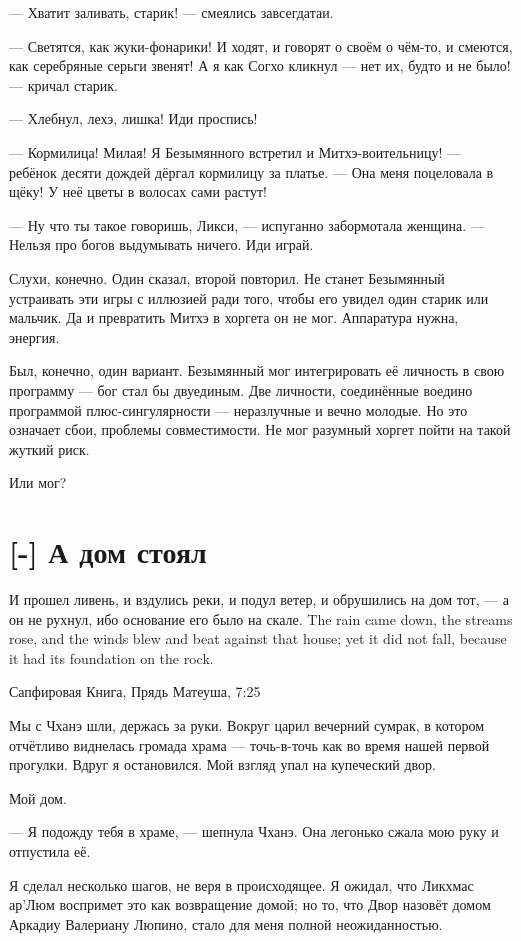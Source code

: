 --- Хватит заливать, старик! --- смеялись завсегдатаи.

--- Светятся, как жуки-фонарики!
И ходят, и говорят о своём о чём-то, и смеются, как серебряные серьги звенят!
А я как Согхо кликнул --- нет их, будто и не было! --- кричал старик.

--- Хлебнул, лехэ, лишка!
Иди проспись!

--- Кормилица!
Милая!
Я Безымянного встретил и Митхэ-воительницу! --- ребёнок десяти дождей дёргал кормилицу за платье.
--- Она меня поцеловала в щёку!
У неё цветы в волосах сами растут!

--- Ну что ты такое говоришь, Ликси, --- испуганно забормотала женщина.
--- Нельзя про богов выдумывать ничего.
Иди играй.

Слухи, конечно.
Один сказал, второй повторил.
Не станет Безымянный устраивать эти игры с иллюзией ради того, чтобы его увидел один старик или мальчик.
Да и превратить Митхэ в хоргета он не мог.
Аппаратура нужна, энергия.

Был, конечно, один вариант.
Безымянный мог интегрировать её личность в свою программу --- бог стал бы двуединым.
Две личности, соединённые воедино программой плюс-сингулярности --- неразлучные и вечно молодые.
Но это означает сбои, проблемы совместимости.
Не мог разумный хоргет пойти на такой жуткий риск.

Или мог?

\section{[-] А дом стоял}

\epigraph{
{И прошел ливень, и вздулись реки, и подул ветер, и обрушились на дом тот, --- а он не рухнул, ибо основание его было на скале.}
{The rain came down, the streams rose, and the winds blew and beat against that house; yet it did not fall, because it had its foundation on the rock.}
}{Сапфировая Книга, Прядь Матеуша, 7:25}

\textspace

Мы с Чханэ шли, держась за руки.
Вокруг царил вечерний сумрак, в котором отчётливо виднелась громада храма --- точь-в-точь как во время нашей первой прогулки.
Вдруг я остановился.
Мой взгляд упал на купеческий двор.

Мой дом.

--- Я подожду тебя в храме, --- шепнула Чханэ.
Она легонько сжала мою руку и отпустила её.

Я сделал несколько шагов, не веря в происходящее.
Я ожидал, что Ликхмас ар'Люм воспримет это как возвращение домой;
но то, что Двор назовёт домом Аркадиу Валериану Люпино, стало для меня полной неожиданностью.

